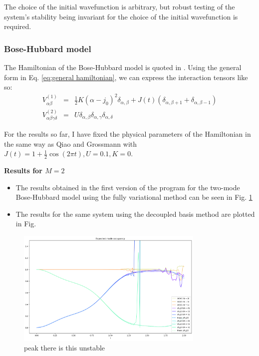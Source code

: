 \documentclass[12pt]{article}
\begin{document}
	 The choice of the initial wavefunction is arbitrary, but robust testing of the system's stability being invariant for the choice of the initial wavefunction is required.
	
	\subsubsection{Bose-Hubbard model}
	The Hamiltonian of the Bose-Hubbard model is quoted in \cite[Eq. 1]{grossmann}. Using the general form in Eq. \ref{eq:general hamiltonian}, we can express the interaction tensors like so:
	\begin{eqnarray}
	V^{(1)}_{\alpha\beta}&=&\frac{1}{2}K(\alpha-j_0)^2\delta_{\alpha,\beta}+J(t)(\delta_{\alpha,\beta +1}+\delta_{\alpha,\beta -1})\\
	V^{(2)}_{\alpha\beta\gamma\delta}&=&U\delta_{\alpha,\beta}\delta_{\alpha,\gamma}\delta_{\alpha,\delta}
	\end{eqnarray}
	
	For the results so far, I have fixed the physical parameters of the Hamiltonian in the same way as Qiao and Grossmann with $J(t)=1+\frac{1}{2}\cos(2\pi t), U=0.1, K=0$.
	
	\textbf{Results for $M=2$}
	\begin{itemize}
	\item The results obtained in the first version of the program for the two-mode Bose-Hubbard model using the fully variational method can be seen in Fig. \ref{fig:BH_M=2_variational}
	\item The results for the same system using the decoupled basis method are plotted in Fig.
	\end{itemize}
	
	\begin{figure}
	\begin{center}
	\includegraphics[width=0.8\textwidth]{images/BH_M=2}
	\caption{peak there is this unstable}\label{fig:BH_M=2_variational}
	\end{center}
	\end{figure}
	
\end{document}

